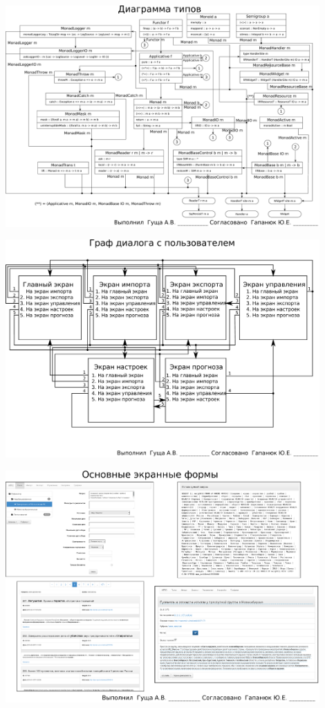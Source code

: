 \documentclass[russian,utf8, a1paper, emptystyle]{eskdgraph}
\begin{document}
\begin{ESKDdrawing}
\includegraphics[width=0.90\textwidth]{lists/list7}
\end{ESKDdrawing}

\begin{ESKDdrawing}
\includegraphics[width=0.90\textwidth]{lists/list8}
\end{ESKDdrawing}

\begin{ESKDdrawing}
\includegraphics[width=0.90\textwidth]{lists/list9_1}
\end{ESKDdrawing}
\end{document}
